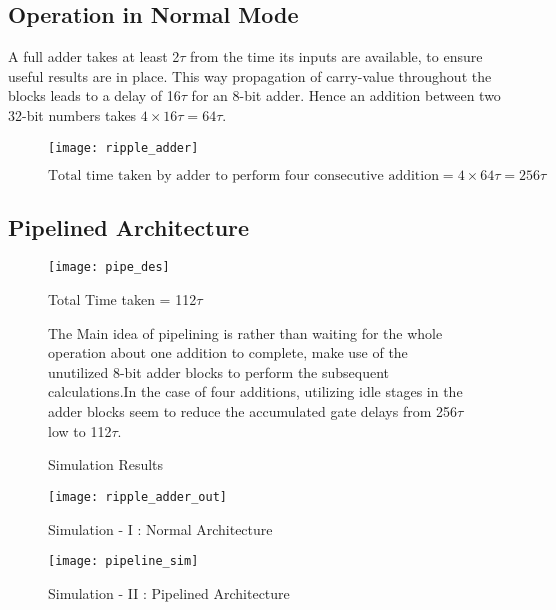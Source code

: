 \documentclass[11pt]{article}
\begin{document}
    \subsection{Operation in Normal Mode}
    A full adder takes at least 2$\tau$ from the time its inputs are available, to ensure useful results are
    in place. This way propagation of carry-value throughout the blocks leads to a delay of 16$\tau$ for an
    8-bit adder. Hence an addition between two 32-bit numbers takes $4\times 16\tau = 64\tau$.

    \begin{figure}[h]
        \begin{center}
            \texttt{[image: ripple\_adder]}
            \caption*{$\text{Total time taken by adder to perform four consecutive addition} = 4\times 64\tau = 256\tau$}
        \end{center}
    \end{figure}
    \vspace{-.5cm}

    \subsection{Pipelined Architecture}
    \vspace{-.5cm}
    \begin{figure}[h]
        \begin{minipage}{.7\textwidth}
            \begin{center}
                \texttt{[image: pipe\_des]}
                \caption*{Total Time taken = 112$\tau$}
            \end{center}
        \end{minipage}
        \begin{minipage}{.28\textwidth}
            The Main idea of pipelining is rather than waiting for the whole operation about one addition to complete, make use of
            the unutilized 8-bit adder blocks to perform the subsequent calculations.In the case of four
            additions, utilizing idle stages in the adder blocks seem to reduce the accumulated
            gate delays from 256$\tau$ low to 112$\tau$.
        \end{minipage}
        \newline
        \caption*{Simulation Results}
        \begin{minipage}{.48\textwidth}
            \begin{center}
                \texttt{[image: ripple\_adder\_out]}
                \caption*{Simulation - I : Normal Architecture}
            \end{center}
        \end{minipage}
        \begin{minipage}{.45\textwidth}
            \begin{center}
                \texttt{[image: pipeline\_sim]}
                \caption*{Simulation - II : Pipelined Architecture}
            \end{center}
        \end{minipage}
    \end{figure}
\end{document}
